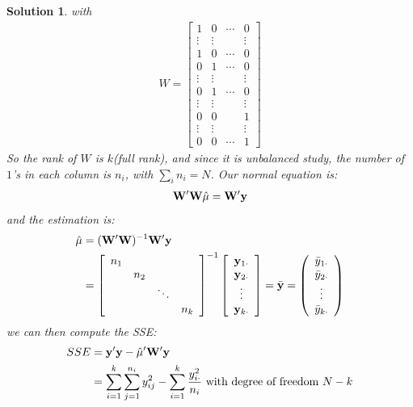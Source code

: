 \documentclass[11pt]{article}
\newtheorem{sol}{Solution}
\begin{document}
\begin{sol}
	with 
	\begin{align*}
		W = \left[\begin{array}{cccc} 1&0&\cdots&0\\ \vdots&\vdots&&\vdots\\ 1&0&\cdots&0\\ 0&1&\cdots&0\\ \vdots&\vdots&&\vdots\\ 0&1&\cdots&0\\ \vdots &\vdots&&\vdots\\ 0&0&&1\\ \vdots&\vdots&&\vdots\\ 0&0&\cdots&1 \end{array}\right]
	\end{align*}
	So the rank of $W$ is $k$(full rank), and since it is unbalanced study, the number of $1$'s in each column is $n_i$, with $\sum_i n_i = N$.\vskip 2mm
	Our normal equation is:
	\begin{align*}
		{\bf W}'{\bf W} \hat{\mu} = {\bf W}'{\bf y}
	\end{align*}
	and the estimation is:
	\begin{align*}
		\hat{\mu} &= ({\bf W}'{\bf W})^{-1}{\bf W}'{\bf y} \\
		&= \left[\begin{array}{cccc} n_1&&&\\ &n_2&&\\ &&\ddots&\\ &&&n_k\end{array}\right]^{-1}\left[\begin{array}{c} {\bf y}_{1\cdot}\\ {\bf y}_{2\cdot}\\ \vdots\\ {\bf y}_{k\cdot}\end{array}\right]=  \bar{{\bf y}} = \left(\begin{array}{c} \bar{y}_{1\cdot}\\ \bar{y}_{2\cdot}\\ \vdots\\ \bar{y}_{k\cdot} \end{array}\right)
	\end{align*}
	we can then compute the SSE:
	\begin{align*}
		SSE &= {\bf y}'{\bf y} - \hat{\mu}'{\bf W}'{\bf y}\\
		&= \sum_{i = 1}^k\sum_{j = 1}^{n_i}y^2_{ij} - \sum_{i = 1}^k\frac{y_{i\cdot}^2}{n_i} \text{ with  degree of freedom }N - k
	\end{align*}

\end{sol}
\end{document}
